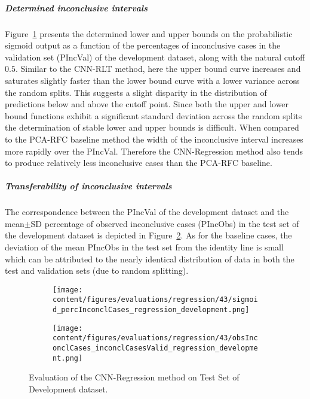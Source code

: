 \subparagraph{Determined inconclusive intervals}

Figure~\ref{fig:regression_percInconclCases_development} presents the determined lower and upper bounds on the 
probabilistic sigmoid output as a function of the percentages of inconclusive cases 
in the validation set (PIncVal) of the development dataset, along with the natural cutoff $0.5$.
Similar to the CNN-RLT method, 
here the upper bound curve increases and saturates slightly faster than the lower bound curve with a lower variance across 
the random splits.
This suggests a slight disparity in the distribution of predictions below and above the cutoff point.
Since both the upper and lower bound functions exhibit a significant standard deviation across the random splits 
the determination of stable lower and upper bounds is difficult.
When compared to the PCA-RFC baseline method 
the width of the inconclusive interval increases more rapidly over the PIncVal.
Therefore the CNN-Regression method also tends to produce relatively less inconclusive cases than the PCA-RFC baseline.


\subparagraph{Transferability of inconclusive intervals}

The correspondence between the PIncVal of the development dataset 
and the mean$\pm$SD percentage of observed inconclusive cases (PIncObs) in the test set of the development dataset 
is depicted in Figure~\ref{fig:obsInconclCases_inconclCasesValid_regression_development}.
As for the baseline cases, the deviation of the mean PIncObs in the test set from the 
identity line is small which can be attributed to the nearly identical distribution of data in both the test and validation sets 
(due to random splitting).


\begin{figure}[ht]
  \begin{subfigure}{0.48\textwidth}
    \centering
    \texttt{[image: content/figures/evaluations/regression/43/sigmoid\_percInconclCases\_regression\_development.png]}
    \label{fig:regression_percInconclCases_development}
  \end{subfigure}
  \hfill
  \begin{subfigure}{0.495\textwidth}
    \centering
    \texttt{[image: content/figures/evaluations/regression/43/obsInconclCases\_inconclCasesValid\_regression\_development.png]}
    \label{fig:obsInconclCases_inconclCasesValid_regression_development}
  \end{subfigure}

  \caption{Evaluation of the CNN-Regression method on Test Set of Development dataset.}
  \label{fig:eval_cnn_regression_dev}
\end{figure}


